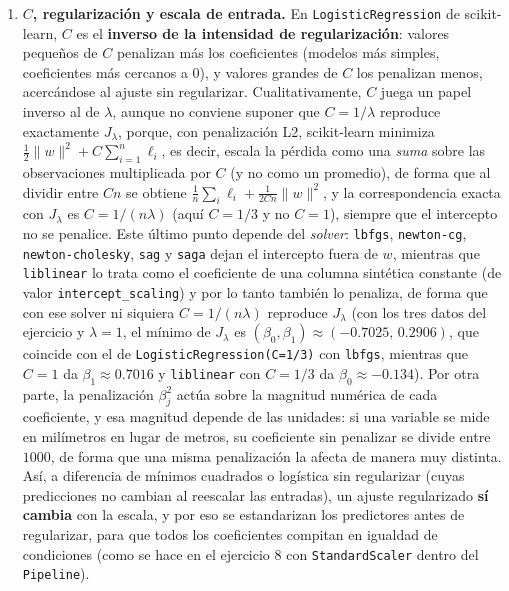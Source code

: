 \begin{enumerate}
\item \textbf{$C$, regularización y escala de entrada.}
En \texttt{LogisticRegression} de scikit-learn, $C$ es el
\textbf{inverso de la intensidad de regularización}: valores pequeños de
$C$ penalizan más los coeficientes (modelos más simples, coeficientes
más cercanos a $0$), y valores grandes de $C$ los penalizan menos,
acercándose al ajuste sin regularizar. Cualitativamente, $C$ juega un
papel inverso al de $\lambda$, aunque no conviene suponer que
$C=1/\lambda$ reproduce exactamente $J_\lambda$, porque, con penalización
L2, scikit-learn minimiza $\tfrac12\lVert w\rVert^2+C\sum_{i=1}^{n}\ell_i$,
es decir, escala la pérdida como una \emph{suma} sobre las observaciones
multiplicada por $C$ (y no como un promedio), de forma que al dividir
entre $Cn$ se obtiene $\tfrac1n\sum_i\ell_i+\tfrac{1}{2Cn}\lVert w\rVert^2$,
y la correspondencia exacta con $J_\lambda$ es $C=1/(n\lambda)$ (aquí
$C=1/3$ y no $C=1$), siempre que el intercepto no se penalice. Este
último punto depende del \emph{solver}: \texttt{lbfgs},
\texttt{newton-cg}, \texttt{newton-cholesky}, \texttt{sag} y
\texttt{saga} dejan el intercepto fuera de $w$, mientras que
\texttt{liblinear} lo trata como el coeficiente de una columna
sintética constante (de valor \texttt{intercept\_scaling}) y por lo
tanto también lo penaliza, de forma que con ese solver ni siquiera
$C=1/(n\lambda)$ reproduce $J_\lambda$ (con los tres datos del
ejercicio y $\lambda=1$, el mínimo de $J_\lambda$ es
$(\beta_0,\beta_1)\approx(-0.7025,\,0.2906)$, que coincide con el de
\texttt{LogisticRegression(C=1/3)} con \texttt{lbfgs}, mientras que
$C=1$ da $\beta_1\approx0.7016$ y \texttt{liblinear} con $C=1/3$ da
$\beta_0\approx-0.134$). Por otra parte, la penalización
$\beta_j^2$ actúa sobre la magnitud numérica de cada coeficiente, y esa
magnitud depende de las unidades: si una variable se mide en milímetros
en lugar de metros, su coeficiente sin penalizar se divide entre $1000$,
de forma que una misma penalización la afecta de manera muy distinta.
Así, a diferencia de mínimos cuadrados o logística sin regularizar
(cuyas predicciones no cambian al reescalar las entradas), un ajuste
regularizado \textbf{sí cambia} con la escala, y por eso se estandarizan
los predictores antes de regularizar, para que todos los coeficientes
compitan en igualdad de condiciones (como se hace en el ejercicio 8 con
\texttt{StandardScaler} dentro del \texttt{Pipeline}).

\end{enumerate}
